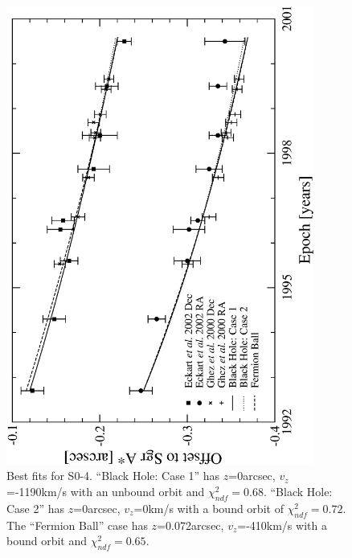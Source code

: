 \begin{figure}[!p]
	\begin{center}
	\includegraphics[angle=-90,width=0.9\textwidth]{eps/bestfits-so4.eps}
	\caption{Best fits for S0-4.
	``Black Hole: Case 1'' has $z$=0arcsec, $v_z$=-1190km/s with an unbound orbit and $\chi^2_{ndf}=0.68$.
	``Black Hole: Case 2'' has $z$=0arcsec, $v_z$=0km/s with a bound orbit of $\chi^2_{ndf}=0.72$.
	The ``Fermion Ball'' case has $z$=0.072arcsec, $v_z$=-410km/s with a bound orbit and $\chi^2_{ndf}=0.65$.}
	\label{fig_so4bestfits}
	\end{center}
\end{figure}
